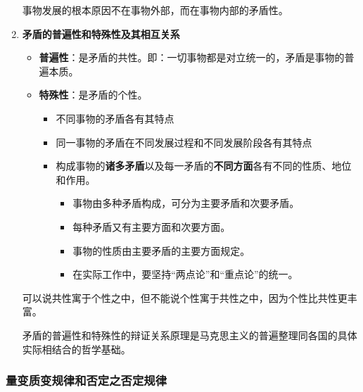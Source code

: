\documentclass[12pt, a4paper, oneside]{ctexart}
\begin{document}
\begin{enumerate}
  事物发展的根本原因不在事物外部，而在事物内部的矛盾性。

  \item {\bf 矛盾的普遍性和特殊性及其相互关系}
  
  \begin{itemize}
    \item {\bf 普遍性}：是矛盾的共性。即：一切事物都是对立统一的，矛盾是事物的普遍本质。
    \item {\bf 特殊性}：是矛盾的个性。
    \begin{itemize}
      \item 不同事物的矛盾各有其特点
      \item 同一事物的矛盾在不同发展过程和不同发展阶段各有其特点
      \item 构成事物的\textbf{诸多矛盾}以及每一矛盾的\textbf{不同方面}各有不同的性质、地位和作用。
      \begin{itemize}
        \item 事物由多种矛盾构成，可分为主要矛盾和次要矛盾。
        \item 每种矛盾又有主要方面和次要方面。
        \item 事物的性质由主要矛盾的主要方面规定。
        \item 在实际工作中，要坚持“两点论”和“重点论”的统一。
      \end{itemize}
    \end{itemize}
  \end{itemize}

  可以说共性寓于个性之中，但不能说个性寓于共性之中，因为个性比共性更丰富。

  矛盾的普遍性和特殊性的辩证关系原理是马克思主义的普遍整理同各国的具体实际相结合的哲学基础。
\end{enumerate}

\subsubsection{量变质变规律和否定之否定规律}
\end{document}

